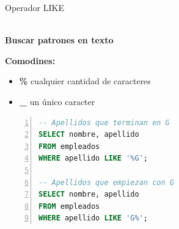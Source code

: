\documentclass{beamer}
\begin{document}
\begin{frame}[fragile]{Operador LIKE}
    \begin{center}
        {\Large \faSearch}\\[0.2cm]
        \textbf{Buscar patrones en texto}
    \end{center}
    
    \vspace{0.3cm}
    
    \textbf{Comodines:}
    \begin{itemize}
        \item \textbf{\%} cualquier cantidad de caracteres
        \item \textbf{\_} un único caracter
    \end{itemize}
    
    \vspace{0.3cm}
    
    \begin{lstlisting}[language=SQL, numbers=left, numbersep=5pt]
-- Apellidos que terminan en G
SELECT nombre, apellido
FROM empleados
WHERE apellido LIKE '%G';

-- Apellidos que empiezan con G
SELECT nombre, apellido
FROM empleados
WHERE apellido LIKE 'G%';
    \end{lstlisting}
\end{frame}
\end{document}
